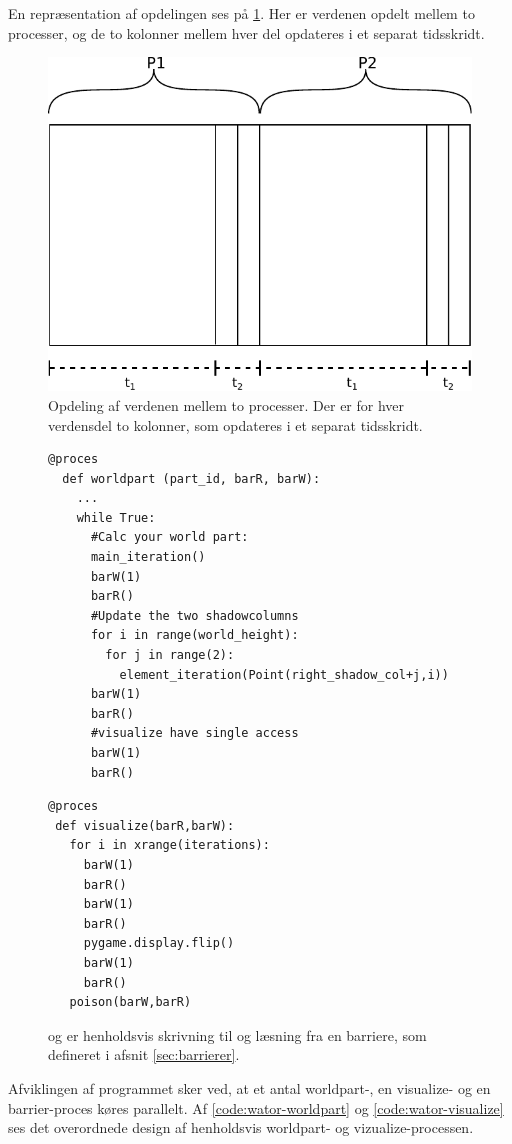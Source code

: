 En repræsentation af opdelingen ses på \cref{fig:wator}. Her er verdenen 
opdelt mellem to processer, og de to kolonner mellem hver del opdateres i et 
separat tidsskridt.  

\begin{figure} 
 \begin{center}
  \includegraphics[scale=0.75]{images/wator}
  \caption{Opdeling af verdenen mellem to processer. Der er for hver verdensdel 
  to kolonner, som opdateres i et separat tidsskridt.}
  \label{fig:wator}
  \end{center}
\end{figure}


\begin{figure}[hbtp] 
\begin{minipage}{\linewidth}
\begin{lstlisting}[label=code:wator-worldpart,caption=Uddrag af worldpart-processen i WaTor]
  @proces
  def worldpart (part_id, barR, barW):  
    ...  
    while True:
      #Calc your world part:
      main_iteration()
      barW(1)
      barR()
      #Update the two shadowcolumns
      for i in range(world_height):
        for j in range(2):
          element_iteration(Point(right_shadow_col+j,i))
      barW(1)
      barR()
      #visualize have single access
      barW(1)
      barR()
\end{lstlisting}

\begin{lstlisting}[label=code:wator-visualize,caption=Uddrag af visualize-processen i WaTor]
@proces
 def visualize(barR,barW):
   for i in xrange(iterations):
     barW(1)
     barR()
     barW(1)
     barR()
     pygame.display.flip()
     barW(1)
     barR()
   poison(barW,barR)
\end{lstlisting}

\end{minipage}
\caption[test]{ og  er henholdsvis skrivning til og læsning fra en barriere, som defineret i afsnit \cref{sec:barrierer}.}
\end{figure}
Afviklingen af programmet sker ved, at et antal worldpart-, en 
visualize- og en barrier-proces køres parallelt. Af 
\autoref{code:wator-worldpart} og \cref{code:wator-visualize} ses det 
overordnede design af henholdsvis worldpart- og 
vizualize-processen.  
